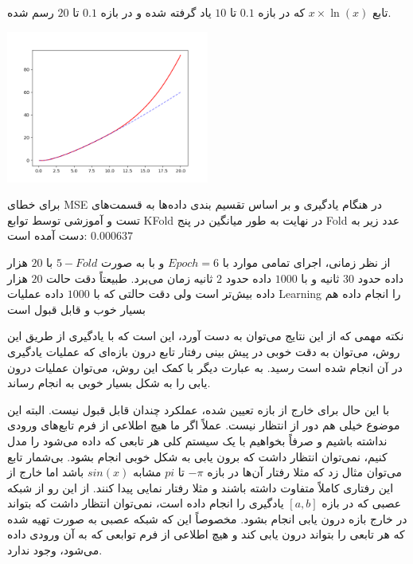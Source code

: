 \documentclass[12pt,titlepage,a4page , tikz , multi,table , svgnames,xcdraw]{article}
\begin{document}
تابع
 $x \times \ln(x)$
  که در بازه $0.1$ تا $10$ یاد گرفته شده و در بازه $0.1$ تا $20$ رسم شده.


\begin{center}

 \includegraphics[width=0.5\textwidth]{pictures/5.png}

\end{center}

برای خطای MSE در هنگام یادگیری و بر اساس تقسیم بندی داده‌ها به قسمت‌های تست و آموزشی توسط توابع KFold در نهایت به طور میانگین در پنج Fold عدد زیر به دست آمده است:
$ 0.000637$


\hrulefill

از نظر زمانی، اجرای تمامی موارد با $Epoch = 6$ و با  به صورت $5-Fold$ با $20$ هزار داده حدود $30$ ثانیه و با $1000$ داده  حدود $2$ ثانیه زمان می‌برد. طبیعتاً دقت حالت $20$ هزار داده بیش‌تر است ولی دقت حالتی که با $1000$ داده عملیات Learning را انجام داده هم بسیار خوب و قابل قبول است

نکته مهمی که از این نتایج می‌توان به دست آورد، این است که با یادگیری از طریق این روش، می‌توان به دقت خوبی در پیش بینی رفتار تابع درون بازه‌ای که عملیات یادگیری در آن انجام شده است رسید. به عبارت دیگر با کمک این روش، می‌توان عملیات درون یابی را به شکل بسیار خوبی به انجام رساند. 

با این حال برای خارج از بازه تعیین شده، عملکرد چندان قابل قبول نیست. البته این موضوع خیلی هم دور از انتظار نیست. عملاً اگر ما هیچ اطلاعی از فرم تابع‌های ورودی نداشته باشیم و صرفاً بخواهیم با یک سیستم کلی هر تابعی که داده می‌شود را مدل کنیم، نمی‌توان انتظار داشت که برون یابی به شکل خوبی انجام بشود. بی‌شمار تابع می‌توان مثال زد که مثلا رفتار آن‌ها در بازه $-\pi$ تا $pi$ مشابه $sin(x)$ باشد اما خارج از این رفتاری کاملاً متفاوت داشته باشند و مثلا رفتار نمایی پیدا کنند. از این رو از شبکه عصبی که در بازه $[a,b]$ یادگیری را انجام داده است، نمی‌توان انتظار داشت که بتواند در خارج بازه درون یابی انجام بشود. مخصوصاً این که شبکه عصبی به صورت  تهیه شده که هر تابعی را بتواند درون یابی کند و هیچ اطلاعی از فرم توابعی که به آن ورودی داده می‌شود، وجود ندارد. 
\end{document}
